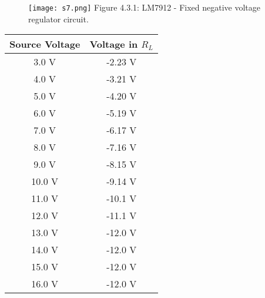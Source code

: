 \begin{multicols}{2}
\begin{tasks}
\begin{figure}[H]
\texttt{[image: s7.png]}
\centering \linebreak \linebreak Figure 4.3.1: LM7912 - Fixed negative voltage regulator circuit.
\end{figure}
\begin{center}
\begin{tabular}[.5cm]{ c c }
\toprule
Source Voltage & Voltage in $R_{L}$ \\
\midrule
3.0 V & -2.23 V \\
\cmidrule{1-2}
4.0 V & -3.21 V \\
\cmidrule{1-2}
5.0 V & -4.20 V \\
\cmidrule{1-2}
6.0 V & -5.19 V \\
\cmidrule{1-2}
7.0 V & -6.17 V \\
\cmidrule{1-2}
8.0 V & -7.16 V \\
\cmidrule{1-2}
9.0 V & -8.15 V \\
\cmidrule{1-2}
10.0 V & -9.14 V \\
\cmidrule{1-2}
11.0 V & -10.1 V \\
\cmidrule{1-2}
12.0 V & -11.1 V \\
\cmidrule{1-2}
13.0 V & -12.0 V \\
\cmidrule{1-2}
14.0 V & -12.0 V \\
\cmidrule{1-2}
15.0 V & -12.0 V \\
\cmidrule{1-2}
16.0 V & -12.0 V \\
\bottomrule
\end{tabular}
\end{center} 
\end{tasks}
\end{multicols}

\pagebreak